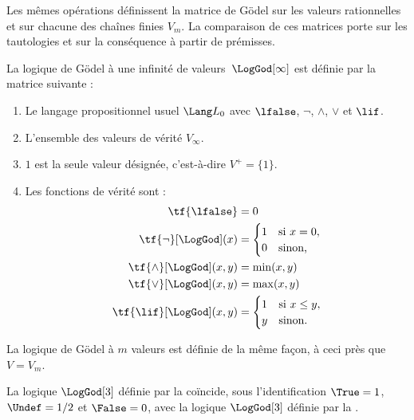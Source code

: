 \documentclass[../../../include/open-logic-section]{subfiles}
\begin{document}


Les mêmes opérations définissent la matrice de G\"odel sur
les valeurs rationnelles et sur chacune des chaînes finies
$V_m$. La comparaison de ces matrices porte sur les
tautologies et sur la conséquence à partir de prémisses.

\begin{defn}
La logique de G\"odel à une infinité
de valeurs~$\LogGod[\infty]$ est
définie par la matrice suivante :
\begin{enumerate}
  \item Le langage propositionnel usuel
  $\Lang L_0$ avec $\lfalse$,
  $\lnot$, $\land$, $\lor$ et $\lif$.
  \item L'ensemble des valeurs de vérité
  $V_\infty$.
  \item $1$ est la seule valeur désignée,
  c'est-à-dire $V^+=\{1\}$.
  \item Les fonctions de vérité sont :
  \begin{align*}
    \tf{\lfalse} &=0\\
    \tf{\lnot}[\LogGod](x)
      &=\begin{cases}
        1 & \text{si }x=0,\\
        0 & \text{sinon,}
      \end{cases}\\
    \tf{\land}[\LogGod](x,y) &=\min(x,y)\\
    \tf{\lor}[\LogGod](x,y) &=\max(x,y)\\
    \tf{\lif}[\LogGod](x,y)
      &=\begin{cases}
        1 & \text{si }x\le y,\\
        y & \text{sinon.}
      \end{cases}
  \end{align*}
\end{enumerate}
La logique de G\"odel à $m$ valeurs
est définie de la même façon, à ceci
près que $V=V_m$.
\end{defn}

\begin{prop}
  La logique $\LogGod[3]$ définie
  par la 
  coïncide, sous l'identification
  $\True=1$, $\Undef=1/2$ et
  $\False=0$, avec la logique
  $\LogGod[3]$ définie par la
  .
\end{prop}
\end{document}
